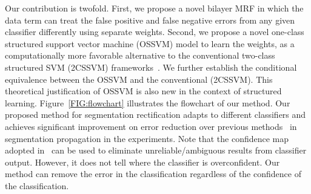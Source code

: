 \documentclass[10pt,journal,compsoc]{newIEEEtran}
\begin{document}
Our contribution is twofold. First, we propose a novel bilayer MRF in which the data term can treat the false positive and false negative errors from any given classifier differently using separate weights. Second, we propose a novel one-class structured support vector machine (OSSVM) model to learn the weights, as a computationally more favorable alternative to the conventional two-class structured SVM (2CSSVM) frameworks~\cite{Taskar05LargeMargin,Tsochantaridis05LargeMarginSSVM}. We further establish the conditional equivalence between the OSSVM and the conventional (2CSSVM). This theoretical justification of OSSVM is also new in the context of structured learning. Figure~\ref{FIG:flowchart} illustrates the flowchart of our method. 
Our proposed method for segmentation rectification adapts to different classifiers and achieves significant improvement on error reduction over previous methods~\cite{Zhong2012UDC_SIGGRAPHAsia,Bai09VideoSnapCut_SIGGRAPH} in segmentation propagation in the experiments. Note that the {confidence map} adopted in~\cite{Zhong2012UDC_SIGGRAPHAsia} can be used to eliminate unreliable/ambiguous results from classifier output. However, it does not tell where the classifier is overconfident. Our method can remove the error in the classification regardless of the confidence of the classification.
\end{document}
